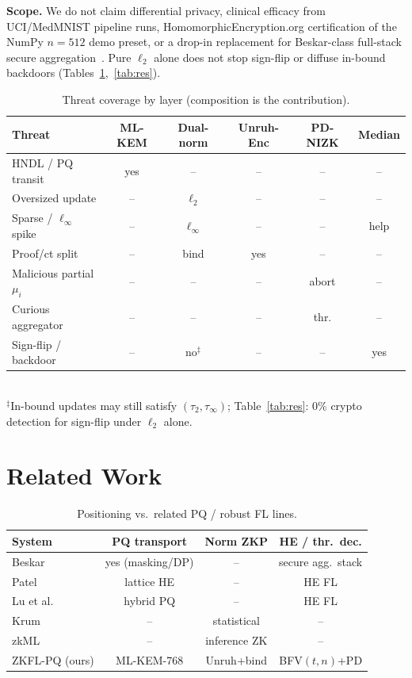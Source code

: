 \documentclass[conference]{IEEEtran}
\begin{document}
\textbf{Scope.} We do not claim differential privacy, clinical efficacy from UCI/MedMNIST pipeline runs, HomomorphicEncryption.org certification of the NumPy $n{=}512$ demo preset, or a drop-in replacement for Beskar-class full-stack secure aggregation~\cite{zhang2025beskar}. Pure $\ell_2$ alone does not stop sign-flip or diffuse in-bound backdoors (Tables~\ref{tab:threats},~\ref{tab:res}).

\begin{table}[t]
\caption{Threat coverage by layer (composition is the contribution).}
\label{tab:threats}
\centering
\scriptsize
\begin{tabular}{@{}lccccc@{}}
\toprule
Threat & ML-KEM & Dual-norm & Unruh-Enc & PD-NIZK & Median \\
\midrule
HNDL / PQ transit & yes & -- & -- & -- & -- \\
Oversized update & -- & $\ell_2$ & -- & -- & -- \\
Sparse / $\ell_\infty$ spike & -- & $\ell_\infty$ & -- & -- & help \\
Proof/ct split & -- & bind & yes & -- & -- \\
Malicious partial $\mu_i$ & -- & -- & -- & abort & -- \\
Curious aggregator & -- & -- & -- & thr. & -- \\
Sign-flip / backdoor & -- & no$^{\ddagger}$ & -- & -- & yes \\
\bottomrule
\end{tabular}\\[1pt]
{\footnotesize $^{\ddagger}$In-bound updates may still satisfy $(\tau_2,\tau_\infty)$; Table~\ref{tab:res}: 0\% crypto detection for sign-flip under $\ell_2$ alone.}
\end{table}

\section{Related Work}
\begin{table}[t]
\caption{Positioning vs.\ related PQ / robust FL lines.}
\label{tab:rel}
\centering
\scriptsize
\begin{tabular}{@{}lccc@{}}
\toprule
System & PQ transport & Norm ZKP & HE / thr.\ dec. \\
\midrule
Beskar~\cite{zhang2025beskar} & yes (masking/DP) & -- & secure agg.\ stack \\
Patel~\cite{patel2025pqfl} & lattice HE & -- & HE FL \\
Lu et al.~\cite{lu2024hybrid} & hybrid PQ & -- & HE FL \\
Krum~\cite{blanchard2017machine} & -- & statistical & -- \\
zkML~\cite{kang2022zkml} & -- & inference ZK & -- \\
ZKFL-PQ (ours) & ML-KEM-768 & Unruh+bind & BFV$(t,n)$+PD \\
\bottomrule
\end{tabular}
\end{table}
\end{document}
